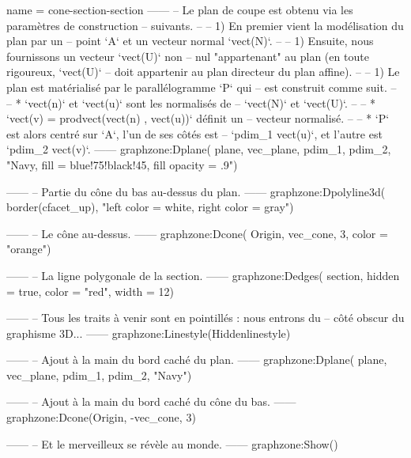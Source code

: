 \documentclass[border = 3pt]{standalone}
\begin{document}
\begin{luadraw}{name = cone-section-section}
------
-- Le plan de coupe est obtenu via les paramètres de construction
-- suivants.
--
--     1) En premier vient la modélisation du plan par un
--     point `A` et un vecteur normal `vect(N)`.
--
--     1) Ensuite, nous fournissons un vecteur `vect(U)` non
--     nul "appartenant" au plan (en toute rigoureux, `vect(U)`
--     doit appartenir au plan directeur du plan affine).
--
--     1) Le plan est matérialisé par le parallélogramme `P` qui
--     est construit comme suit.
--
--         * `vect(n)` et `vect(u)` sont les normalisés de
--         `vect(N)` et `vect(U)`.
--
--         * `vect(v) = prodvect(vect(n) , vect(u))` définit un
--         vecteur normalisé.
--
--         * `P` est alors centré sur `A`, l'un de ses côtés est
--         `pdim_1 vect(u)`, et l'autre est `pdim_2 vect(v)`.
------
    graphzone:Dplane(
        plane,
        vec_plane, pdim_1, pdim_2,
        "Navy, fill = blue!75!black!45, fill opacity = .9")

------
-- Partie du cône du bas au-dessus du plan.
------
    graphzone:Dpolyline3d(
        border(cfacet_up),
        "left color = white, right color = gray")

------
-- Le cône au-dessus.
------
    graphzone:Dcone(
        Origin, vec_cone, 3,
        {color = "orange"})

------
-- La ligne polygonale de la section.
------
    graphzone:Dedges(
        section,
        {hidden = true, color = "red", width = 12})

------
-- Tous les traits à venir sont en pointillés : nous entrons du
-- côté obscur du graphisme 3D...
------
    graphzone:Linestyle(Hiddenlinestyle)

------
-- Ajout à la main du bord caché du plan.
------
    graphzone:Dplane(
        plane,
        vec_plane, pdim_1, pdim_2,
        "Navy")

------
-- Ajout à la main du bord caché du cône du bas.
------
    graphzone:Dcone(Origin, -vec_cone, 3)

------
-- Et le merveilleux se révèle au monde.
------
    graphzone:Show()
\end{luadraw}
\end{document}
